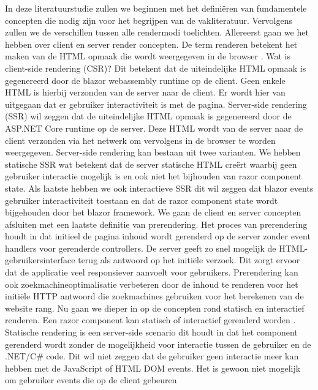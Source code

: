 \documentclass{hogent-article}
\begin{document}
In deze literatuurstudie zullen we beginnen met het definiëren van fundamentele concepten die nodig zijn voor het begrijpen van de vakliteratuur. Vervolgens zullen we de verschillen
tussen alle rendermodi toelichten. Allereerst gaan we het hebben over client en server render concepten. De term renderen betekent het maken van de 
HTML opmaak die wordt weergegeven in de browser \autocite{Guardrex2023}.  Wat is client-side rendering (CSR)? Dit betekent dat de uiteindelijke HTML opmaak is 
gegenereerd door de blazor webassembly runtime op de client. Geen enkele HTML is hierbij verzonden van de server naar de client. Er wordt hier van uitgegaan dat er 
gebruiker interactiviteit is met de pagina. \autocite{Guardrex2023} Server-side rendering (SSR) wil zeggen dat de uiteindelijke HTML opmaak is gegenereerd door de ASP.NET Core runtime
op de server. Deze HTML wordt van de server naar de client verzonden via het netwerk om vervolgens in de browser te worden weergegeven. Server-side rendering kan bestaan uit twee
varianten. We hebben statische SSR wat betekent dat de server statische HTML creërt waarbij geen gebruiker interactie mogelijk is en ook niet het bijhouden van razor component state.
Als laatste hebben we ook interactieve SSR dit wil zeggen dat blazor events gebruiker interactiviteit toestaan en dat de razor component state wordt bijgehouden door het blazor framework. \autocite{Guardrex2023}
We gaan de client en server concepten afsluiten met een laatste definitie van prerendering. Het proces van prerendering houdt in dat initieel de pagina inhoud wordt gerenderd op de server zonder event handlers voor gerenderde controllers.
De server geeft zo snel mogelijk de HTML-gebruikersinterface terug als antwoord op het initiële verzoek. Dit zorgt ervoor dat de applicatie veel responsiever aanvoelt voor gebruikers.
Prerendering kan ook zoekmachineoptimalisatie verbeteren door de inhoud te renderen voor het initiële HTTP antwoord die zoekmachines gebruiken voor het berekenen van de website rang. \autocite{Guardrex2023}
Nu gaan we dieper in op de concepten rond statisch en interactief renderen. Een razor component kan statisch of interactief gerenderd worden \autocite{Guardrex2023}.
Statische rendering is een server-side scenario dit houdt in dat het component gerenderd wordt zonder de mogelijkheid voor interactie tussen de gebruiker en de .NET/C\# code.
Dit wil niet zeggen dat de gebruiker geen interactie meer kan hebben met de JavaScript of HTML DOM events. Het is gewoon niet mogelijk om gebruiker events die op de client gebeuren
\end{document}
